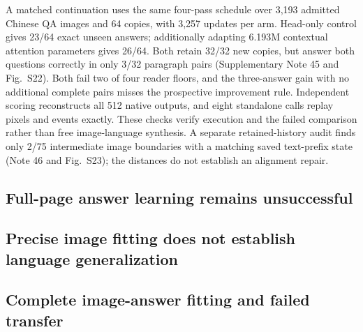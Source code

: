 A matched continuation uses the same four-pass schedule over 3,193 admitted
Chinese QA images and 64 copies, with 3,257 updates per arm. Head-only
control gives 23/64 exact unseen answers; additionally adapting 6.193M
contextual attention parameters gives 26/64. Both retain 32/32 new copies,
but answer both questions correctly in only 3/32 paragraph pairs
(Supplementary Note 45 and Fig.~S22). Both fail two of four reader floors,
and the three-answer gain with no additional complete pairs misses the
prospective improvement rule. Independent scoring reconstructs all 512
native outputs, and eight standalone calls replay pixels and events
exactly. These checks verify execution and the failed comparison rather
than free image-language synthesis. A separate retained-history audit
finds only 2/75 intermediate image boundaries with a matching saved
text-prefix state (Note 46 and Fig.~S23); the distances do not establish
an alignment repair.

\subsection*{Full-page answer learning remains unsuccessful}




\subsection*{Precise image fitting does not establish language generalization}


\subsection*{Complete image-answer fitting and failed transfer}














